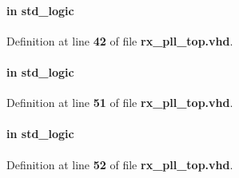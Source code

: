 \paragraph[{pll\+\_\+logic\+\_\+reset\+\_\+n}]{ {\bfseries \textcolor{keywordflow}{in}\textcolor{vhdlchar}{ }} {\bfseries \textcolor{comment}{std\+\_\+logic}\textcolor{vhdlchar}{ }} \hspace{0.3cm}{\ttfamily [Port]}}\label{classrx__pll__top_aaa326fc2a274fc920323383778c38860}


Definition at line {\bf 42} of file {\bf rx\+\_\+pll\+\_\+top.\+vhd}.

\paragraph[{rcnfg\+\_\+clk}]{ {\bfseries \textcolor{keywordflow}{in}\textcolor{vhdlchar}{ }} {\bfseries \textcolor{comment}{std\+\_\+logic}\textcolor{vhdlchar}{ }} \hspace{0.3cm}{\ttfamily [Port]}}\label{classrx__pll__top_aefb0e3a32f171ab0f0a94dfbc5ef3a3b}


Definition at line {\bf 51} of file {\bf rx\+\_\+pll\+\_\+top.\+vhd}.

\paragraph[{rcnfig\+\_\+areset}]{ {\bfseries \textcolor{keywordflow}{in}\textcolor{vhdlchar}{ }} {\bfseries \textcolor{comment}{std\+\_\+logic}\textcolor{vhdlchar}{ }} \hspace{0.3cm}{\ttfamily [Port]}}\label{classrx__pll__top_a628aee3b42b899d0f4f844555f782667}


Definition at line {\bf 52} of file {\bf rx\+\_\+pll\+\_\+top.\+vhd}.

